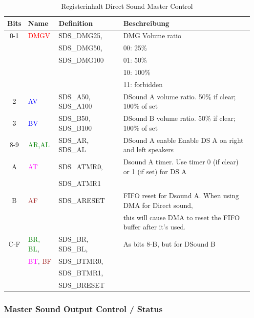 \documentclass[11pt,a4paper]{scrartcl}
\begin{document}
	\begin{table}[h]
	\centering
	\begin{tabular}{| c | l | l | l |}
	\hline
	\textbf{Bits} & \textbf{Name} & \textbf{Definition} & \textbf{Beschreibung} \\
	\hline
	0-1 & \textcolor{red}{DMGV} & SDS\_DMG25, & DMG Volume ratio \\
	& & SDS\_DMG50, & 00: 25\% \\
	& & SDS\_DMG100 & 01: 50\% \\
	& & & 10: 100\% \\
  & & & 11: forbidden \\
	\hline
	2 & \textcolor{blue}{AV} & SDS\_A50, SDS\_A100 & DSound A volume ratio. 50\% if clear; 100\% of set  \\
	\hline
	3 & \textcolor{blue}{BV} & SDS\_B50, SDS\_B100 & DSound B volume ratio. 50\% if clear; 100\% of set  \\
	\hline
	8-9 & \textcolor{green}{AR,AL} & SDS\_AR, SDS\_AL & DSound A enable Enable DS A on right and left speakers \\
	\hline
	A & \textcolor{magenta}{AT} & SDS\_ATMR0, & Dsound A timer. Use timer 0 (if clear) or 1 (if set) for DS A \\
	& & SDS\_ATMR1 & \\
	\hline
	B & \textcolor{brown}{AF} & SDS\_ARESET &  FIFO reset for Dsound A. When using DMA for Direct sound,  \\
	& & & this will cause DMA to reset the FIFO buffer after it's used.\\
	\hline
	C-F & \textcolor{green}{BR, BL},  &  SDS\_BR, SDS\_BL, & As bits 8-B, but for DSound B \\
	& \textcolor{magenta}{BT}, \textcolor{brown}{BF} & SDS\_BTMR0,  & \\
	& & SDS\_BTMR1, & \\
	& &  SDS\_BRESET & \\
	\hline
	\end{tabular}
	\caption{Registerinhalt Direct Sound Master Control}
	\label{table: DirectSoundMasterControlContent}
	\end{table}
	
	\newpage
	
	
\subsubsection{Master Sound Output Control / Status}
	
\end{document}
